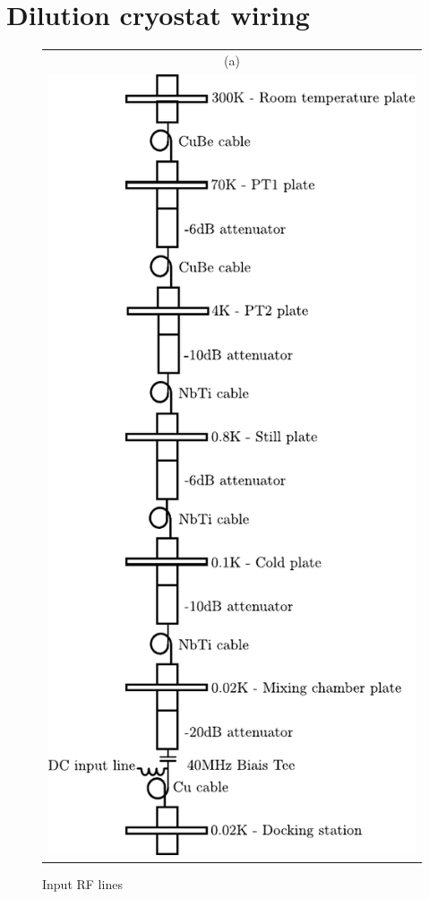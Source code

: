 \chapter{Dilution cryostat wiring}


\begin{figure}[hptb]
	\begin{center}
		\begin{tabular}{c}
			(a) \\ 
			
			\includegraphics[height = 12 cm]{./appB/input_RF_line} 
		\end{tabular}
	\end{center}
	
	\caption{Input RF lines}
	\label{fig: Input RF lines}
\end{figure}

